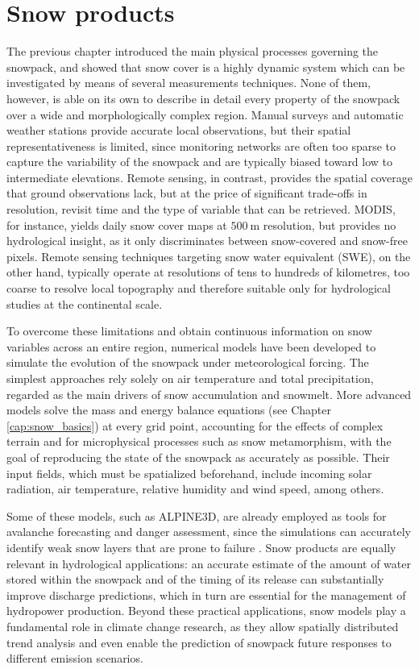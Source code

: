 \chapter{Snow products}
\label{cap:snow_products}

The previous chapter introduced the main physical processes governing the snowpack, and showed that snow cover is a highly dynamic system which can be 
investigated by means of several measurements techniques. None of them, however, is able on its own to describe in detail every property of the snowpack over a wide 
and morphologically complex region. Manual surveys and automatic weather stations provide accurate local observations, but their spatial 
representativeness is limited, since monitoring networks are often too sparse to capture the variability of the snowpack and are typically 
biased toward low to intermediate elevations. Remote sensing, in contrast, provides the spatial coverage that ground observations lack, but at the 
price of significant trade-offs in resolution, revisit time and the type of variable that can be retrieved. MODIS, for instance, yields daily snow 
cover maps at $\SI{500}{\meter}$ resolution, but provides no hydrological insight, as it only discriminates between snow-covered and 
snow-free pixels. Remote sensing techniques targeting snow water equivalent (SWE), on the other hand, typically operate at resolutions of tens to 
hundreds of kilometres, too coarse to resolve local topography and therefore suitable only for hydrological studies at the continental scale.  

To overcome these limitations and obtain continuous information on snow variables across an entire region, numerical models have been developed to 
simulate the evolution of the snowpack under meteorological forcing. The simplest approaches rely solely on air temperature and total precipitation, regarded 
as the main drivers of snow accumulation and snowmelt. More advanced models solve the mass and energy balance equations (see Chapter \ref{cap:snow_basics}) 
at every grid point, accounting for the effects of complex terrain and for microphysical processes such as snow metamorphism, with the goal of reproducing 
the state of the snowpack as accurately as possible. Their input fields, which must be spatialized beforehand, include incoming solar radiation, air 
temperature, relative humidity and wind speed, among others. 

Some of these models, such as ALPINE3D, are already employed as tools for avalanche forecasting and danger assessment, since the simulations can accurately 
identify weak snow layers that are prone to failure \parencite{ALPINE3D}. Snow products are equally relevant in hydrological applications: an accurate estimate of 
the amount of water stored within the snowpack and of the timing of its release can substantially improve discharge predictions, which in turn are essential 
for the management of hydropower production. Beyond these practical applications, snow models play a fundamental role in climate change research, as they 
allow spatially distributed trend analysis and even enable the prediction of snowpack future responses to different emission scenarios. 

